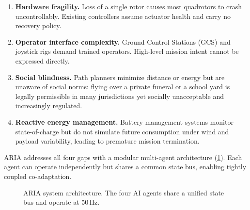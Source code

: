 \documentclass[10pt,twocolumn]{article}
\begin{document}
\begin{enumerate}
    \item \textbf{Hardware fragility.} Loss of a single rotor causes
    most quadrotors to crash uncontrollably. Existing controllers
    assume actuator health and carry no recovery policy.

    \item \textbf{Operator interface complexity.} Ground Control
    Stations (GCS) and joystick rigs demand trained operators.
    High-level mission intent cannot be expressed directly.

    \item \textbf{Social blindness.} Path planners minimize
    distance or energy but are unaware of social norms: flying
    over a private funeral or a school yard is legally permissible
    in many jurisdictions yet socially unacceptable and increasingly
    regulated.

    \item \textbf{Reactive energy management.} Battery management
    systems monitor state-of-charge but do not simulate future
    consumption under wind and payload variability, leading to
    premature mission termination.
\end{enumerate}

ARIA addresses all four gaps with a modular multi-agent architecture
(\cref{fig:architecture}). Each agent can operate independently but
shares a common state bus, enabling tightly coupled co-adaptation.

\begin{figure}[t]
    \centering
    \caption{ARIA system architecture. The four AI agents share a
    unified state bus and operate at 50\,Hz.}
    \label{fig:architecture}
\end{figure}
\end{document}
